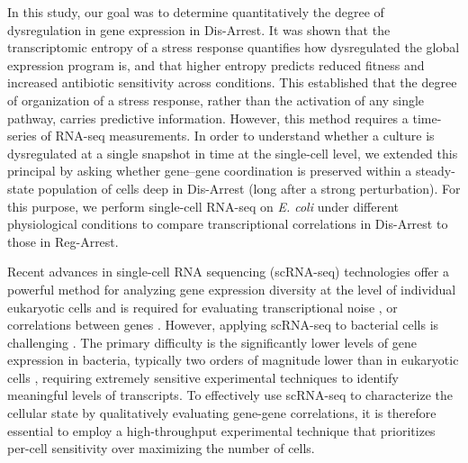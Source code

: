 \documentclass[12pt]{article}
\begin{document}
 In this study, our goal was to determine quantitatively the degree of dysregulation in gene expression in Dis-Arrest.  It was shown that the transcriptomic entropy of a stress response quantifies how dysregulated the global expression program is, and that higher entropy predicts reduced fitness and increased antibiotic sensitivity across conditions\cite{Zhu2020}. This established that the degree of organization of a stress response, rather than the activation of any single pathway, carries predictive information. However, this method requires a time-series of RNA-seq measurements. In order to understand whether a culture is dysregulated at a single snapshot in time at the single-cell level, we extended this principal by asking whether gene–gene coordination is preserved within a steady-state population of cells deep in Dis-Arrest (long after a strong perturbation). For this purpose, we perform single-cell RNA-seq on \textit{E. coli} under different physiological conditions to compare transcriptional correlations in Dis-Arrest to those in Reg-Arrest. 
 \par Recent advances in single-cell RNA sequencing (scRNA-seq) technologies offer a powerful method for analyzing gene expression diversity at the level of individual eukaryotic cells \cite{Tang2009,Hashimshony2012,Picelli2013,Fodor2015,MACOSKO20151202,Picelli_review,QUAKE20211064} and is required for evaluating transcriptional noise \cite{Marti2022.06.23.497402}, or correlations between genes \cite{Levy2020,Su2023,Pountain2024, Silkwood2024, Kim-cell2024}. However, applying scRNA-seq to bacterial cells is challenging \cite{Blattman2020,Imdahl2020, Kuchina2021, Wang2023, Deborah_cell_2023, McNulty2023}. The primary difficulty is the significantly lower levels of gene expression in bacteria, typically two orders of magnitude lower than in eukaryotic cells \cite{Homberger2022}, requiring extremely sensitive experimental techniques to identify meaningful levels of transcripts. To effectively use scRNA-seq to characterize the cellular state by qualitatively evaluating gene-gene correlations, it is therefore essential to employ a high-throughput experimental technique that prioritizes per-cell sensitivity over maximizing the number of cells.
\par
\end{document}
